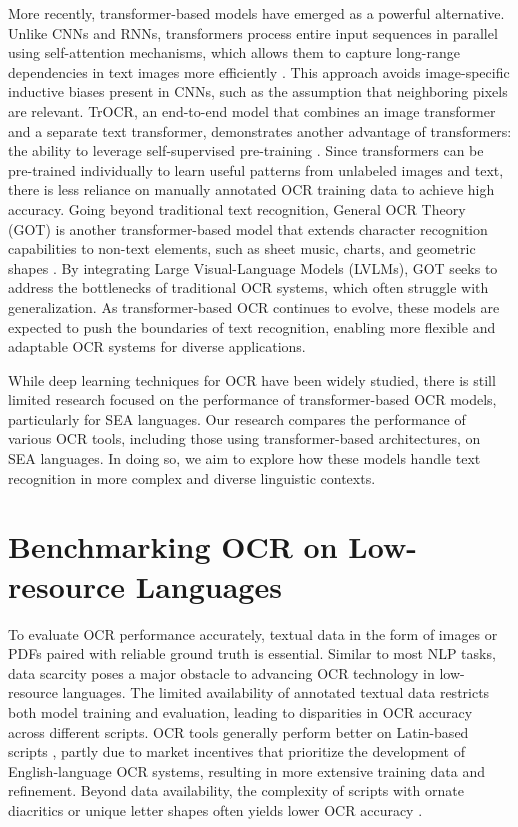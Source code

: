 \documentclass[12pt,oneside]{memoir}
\begin{document}
More recently, transformer-based models have emerged as a powerful alternative.
Unlike CNNs and RNNs, transformers process entire input sequences in parallel using self-attention mechanisms, which allows them to capture long-range dependencies in text images more efficiently \parencite{vaswani-2017}.
This approach avoids image-specific inductive biases present in CNNs, such as the assumption that neighboring pixels are relevant.
TrOCR, an end-to-end model that combines an image transformer and a separate text transformer, demonstrates another advantage of transformers: the ability to leverage self-supervised pre-training \parencite{li-etal-2021}. 
Since transformers can be pre-trained individually to learn useful patterns from unlabeled images and text, there is less reliance on manually annotated OCR training data to achieve high accuracy.
Going beyond traditional text recognition, General OCR Theory (GOT) is another transformer-based model that extends character recognition capabilities to non-text elements, such as sheet music, charts, and geometric shapes \parencite{wei-etal-2024}.
By integrating Large Visual-Language Models (LVLMs), GOT seeks to address the bottlenecks of traditional OCR systems, which often struggle with generalization.
As transformer-based OCR continues to evolve, these models are expected to push the boundaries of text recognition, enabling more flexible and adaptable OCR systems for diverse applications.

While deep learning techniques for OCR have been widely studied, there is still limited research focused on the performance of transformer-based OCR models, particularly for SEA languages.
Our research compares the performance of various OCR tools, including those using transformer-based architectures, on SEA languages. 
In doing so, we aim to explore how these models handle text recognition in more complex and diverse linguistic contexts.

\section{Benchmarking OCR on Low-resource Languages}

To evaluate OCR performance accurately, textual data in the form of images or PDFs paired with reliable ground truth is essential. 
Similar to most NLP tasks, data scarcity poses a major obstacle to advancing OCR technology in low-resource languages. The limited availability of annotated textual data restricts both model training and evaluation, leading to disparities in OCR accuracy across different scripts.
OCR tools generally perform better on Latin-based scripts \parencite{hegghammer-2022}, partly due to market incentives that prioritize the development of English-language OCR systems, resulting in more extensive training data and refinement.
Beyond data availability, the complexity of scripts with ornate diacritics or unique letter shapes often yields lower OCR accuracy \parencite{agarwal-and-anastasopoulos-2024}.
\end{document}
